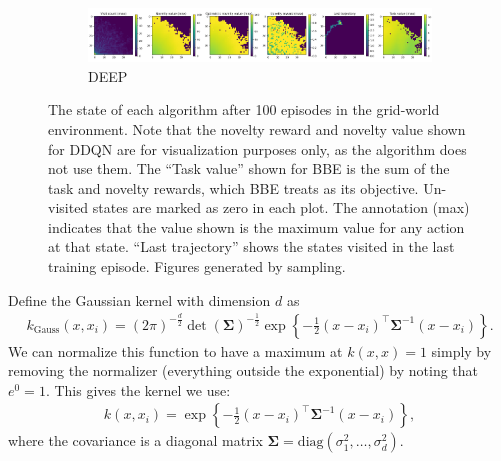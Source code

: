 \begin{subappendices}
\begin{figure}[h]
    \begin{subfigure}[b]{\textwidth}
        \centering
        \includegraphics[height=0.15\textwidth]{figures/deep/gridworld_100_deep.png}
        \caption{DEEP}
    \end{subfigure}
    \caption{The state of each algorithm after 100 episodes in the grid-world environment.
        Note that the novelty reward and novelty value shown for DDQN are for visualization purposes only, as the algorithm does not use them.
        The ``Task value'' shown for BBE is the sum of the task and novelty rewards, which BBE treats as its objective.
        Un-visited states are marked as zero in each plot.
        The annotation (max) indicates that the value shown is the maximum value for any action at that state.
        ``Last trajectory'' shows the states visited in the last training episode.
        Figures generated by sampling.}
        \label{fig:gridworld_algorithm_states}
\end{figure}


 \label{sec:count_implementation}


Define the Gaussian kernel with dimension $d$ as
\begin{align}
    k_\text{Gauss}(x, x_i) = (2 \pi) ^ {-\frac{d}{2}} \det(\bm{\Sigma})^{-\frac{1}{2}} \exp \left\{-\frac{1}{2} (x - x_i)^\intercal \bm{\Sigma}^{-1} (x - x_i) \right\}.
\end{align}
We can normalize this function to have a maximum at $k(x, x) = 1$ simply by removing the normalizer (everything outside the exponential) by noting that $e^0 = 1$.
This gives the kernel we use:
\begin{align} \label{eq:count_kernel}
    k(x, x_i) = \exp \left\{-\frac{1}{2} (x - x_i)^\intercal \bm{\Sigma}^{-1} (x - x_i) \right\},
\end{align}
where the covariance is a diagonal matrix $\bm{\Sigma} = \text{diag}(\sigma_1^2, \ldots, \sigma_d^2)$.


\end{subappendices}
